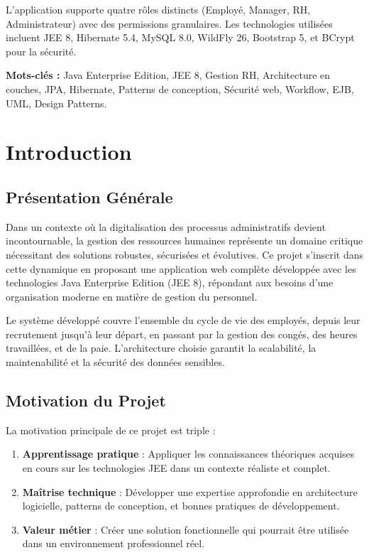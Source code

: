 \documentclass[12pt,a4paper,twoside]{report}
\begin{document}
L'application supporte quatre rôles distincts (Employé, Manager, RH, Administrateur) avec des permissions granulaires. Les technologies utilisées incluent JEE 8, Hibernate 5.4, MySQL 8.0, WildFly 26, Bootstrap 5, et BCrypt pour la sécurité.

\textbf{Mots-clés :} Java Enterprise Edition, JEE 8, Gestion RH, Architecture en couches, JPA, Hibernate, Patterns de conception, Sécurité web, Workflow, EJB, UML, Design Patterns.

\mainmatter

\chapter{Introduction}

\section{Présentation Générale}

Dans un contexte où la digitalisation des processus administratifs devient incontournable, la gestion des ressources humaines représente un domaine critique nécessitant des solutions robustes, sécurisées et évolutives. Ce projet s'inscrit dans cette dynamique en proposant une application web complète développée avec les technologies Java Enterprise Edition (JEE 8), répondant aux besoins d'une organisation moderne en matière de gestion du personnel.

Le système développé couvre l'ensemble du cycle de vie des employés, depuis leur recrutement jusqu'à leur départ, en passant par la gestion des congés, des heures travaillées, et de la paie. L'architecture choisie garantit la scalabilité, la maintenabilité et la sécurité des données sensibles.

\section{Motivation du Projet}

La motivation principale de ce projet est triple :
\begin{enumerate}
    \item \textbf{Apprentissage pratique} : Appliquer les connaissances théoriques acquises en cours sur les technologies JEE dans un contexte réaliste et complet.
    \item \textbf{Maîtrise technique} : Développer une expertise approfondie en architecture logicielle, patterns de conception, et bonnes pratiques de développement.
    \item \textbf{Valeur métier} : Créer une solution fonctionnelle qui pourrait être utilisée dans un environnement professionnel réel.
\end{enumerate}
\end{document}
